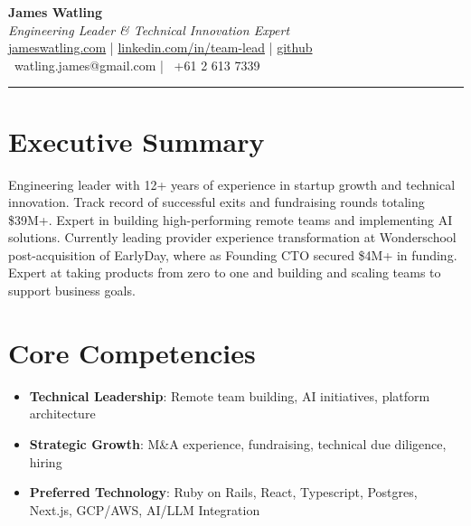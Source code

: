 \documentclass[letterpaper,10pt]{article}
\begin{document}
\begin{center}
    {\huge \textbf{James Watling}}\\
    \vspace{5pt}
    \textit{Engineering Leader \& Technical Innovation Expert} \\
    \vspace{5pt}
    \href{https://jameswatling.com}{jameswatling.com} \quad | \quad
    \href{https://www.linkedin.com/in/team-lead/}{linkedin.com/in/team-lead}  \quad | \quad
    \href{https://github.com/JamesWatling/}{github}
    \\
    \vspace{3pt}
    \faEnvelope\, watling.james@gmail.com \quad | \quad \faPhone\, +61 2 613 7339
\end{center}

\hrule
\section*{Executive Summary}
Engineering leader with 12+ years of experience in startup growth and technical innovation. Track record of successful exits and fundraising rounds totaling \$39M+. Expert in building high-performing remote teams and implementing AI solutions. Currently leading provider experience transformation at Wonderschool post-acquisition of EarlyDay, where as Founding CTO secured \$4M+ in funding. Expert at taking products from zero to one and building and scaling teams to support business goals.

\section*{Core Competencies}
\begin{itemize}[leftmargin=*, nosep]
    \item \textbf{Technical Leadership}: Remote team building, AI initiatives, platform architecture
    \item \textbf{Strategic Growth}: M\&A experience, fundraising, technical due diligence, hiring
    \item \textbf{Preferred Technology}: Ruby on Rails, React, Typescript, Postgres, Next.js, GCP/AWS, AI/LLM Integration
\end{itemize}

\end{document}
